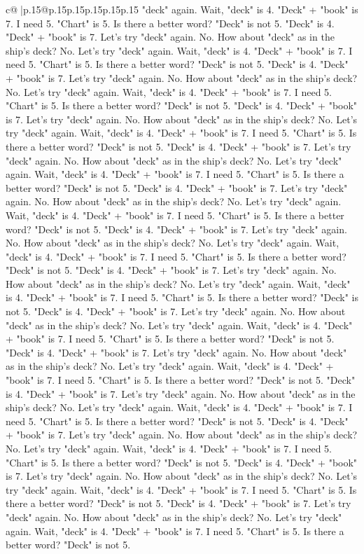 \documentclass{article}
\begin{document}
{\begin{supertabular}{c@{$\;$}|p{.15\linewidth}@{}p{.15\linewidth}p{.15\linewidth}p{.15\linewidth}p{.15\linewidth}p{.15\linewidth}}
{{{"deck" again. Wait, "deck" is 4. "Deck" + "book" is 7. I need 5. "Chart" is 5. Is there a better word? "Deck" is not 5. "Deck" is 4. "Deck" + "book" is 7. Let's try "deck" again. No. How about "deck" as in the ship's deck? No. Let's try "deck" again. Wait, "deck" is 4. "Deck" + "book" is 7. I need 5. "Chart" is 5. Is there a better word? "Deck" is not 5. "Deck" is 4. "Deck" + "book" is 7. Let's try "deck" again. No. How about "deck" as in the ship's deck? No. Let's try "deck" again. Wait, "deck" is 4. "Deck" + "book" is 7. I need 5. "Chart" is 5. Is there a better word? "Deck" is not 5. "Deck" is 4. "Deck" + "book" is 7. Let's try "deck" again. No. How about "deck" as in the ship's deck? No. Let's try "deck" again. Wait, "deck" is 4. "Deck" + "book" is 7. I need 5. "Chart" is 5. Is there a better word? "Deck" is not 5. "Deck" is 4. "Deck" + "book" is 7. Let's try "deck" again. No. How about "deck" as in the ship's deck? No. Let's try "deck" again. Wait, "deck" is 4. "Deck" + "book" is 7. I need 5. "Chart" is 5. Is there a better word? "Deck" is not 5. "Deck" is 4. "Deck" + "book" is 7. Let's try "deck" again. No. How about "deck" as in the ship's deck? No. Let's try "deck" again. Wait, "deck" is 4. "Deck" + "book" is 7. I need 5. "Chart" is 5. Is there a better word? "Deck" is not 5. "Deck" is 4. "Deck" + "book" is 7. Let's try "deck" again. No. How about "deck" as in the ship's deck? No. Let's try "deck" again. Wait, "deck" is 4. "Deck" + "book" is 7. I need 5. "Chart" is 5. Is there a better word? "Deck" is not 5. "Deck" is 4. "Deck" + "book" is 7. Let's try "deck" again. No. How about "deck" as in the ship's deck? No. Let's try "deck" again. Wait, "deck" is 4. "Deck" + "book" is 7. I need 5. "Chart" is 5. Is there a better word? "Deck" is not 5. "Deck" is 4. "Deck" + "book" is 7. Let's try "deck" again. No. How about "deck" as in the ship's deck? No. Let's try "deck" again. Wait, "deck" is 4. "Deck" + "book" is 7. I need 5. "Chart" is 5. Is there a better word? "Deck" is not 5. "Deck" is 4. "Deck" + "book" is 7. Let's try "deck" again. No. How about "deck" as in the ship's deck? No. Let's try "deck" again. Wait, "deck" is 4. "Deck" + "book" is 7. I need 5. "Chart" is 5. Is there a better word? "Deck" is not 5. "Deck" is 4. "Deck" + "book" is 7. Let's try "deck" again. No. How about "deck" as in the ship's deck? No. Let's try "deck" again. Wait, "deck" is 4. "Deck" + "book" is 7. I need 5. "Chart" is 5. Is there a better word? "Deck" is not 5. "Deck" is 4. "Deck" + "book" is 7. Let's try "deck" again. No. How about "deck" as in the ship's deck? No. Let's try "deck" again. Wait, "deck" is 4. "Deck" + "book" is 7. I need 5. "Chart" is 5. Is there a better word? "Deck" is not 5. "Deck" is 4. "Deck" + "book" is 7. Let's try "deck" again. No. How about "deck" as in the ship's deck? No. Let's try "deck" again. Wait, "deck" is 4. "Deck" + "book" is 7. I need 5. "Chart" is 5. Is there a better word? "Deck" is not 5. "Deck" is 4. "Deck" + "book" is 7. Let's try "deck" again. No. How about "deck" as in the ship's deck? No. Let's try "deck" again. Wait, "deck" is 4. "Deck" + "book" is 7. I need 5. "Chart" is 5. Is there a better word? "Deck" is not 5. }}}
\end{supertabular}}
\end{document}
